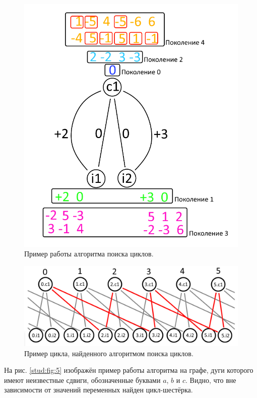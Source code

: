 \documentclass[14pt]{mmcs_article}
\begin{document}
\begin{figure}[H]
  \centering
  \includegraphics[scale=0.6]{Fig_3.png}
  \caption{ Пример работы алгоритма поиска циклов. }
  \label{stud:fig:3}
\end{figure}

\begin{figure}[H]
  \centering
  \includegraphics[scale=0.4]{Fig_4.png}
  \caption{ Пример цикла, найденного алгоритмом поиска циклов. }
  \label{stud:fig:4}
\end{figure}

На рис. \ref{stud:fig:5} изображён пример работы алгоритма на графе, дуги которого имеют неизвестные сдвиги, обозначенные буквами $a$, $b$ и $c$. Видно, что вне зависимости от значений переменных найден цикл-шестёрка.
\end{document}
